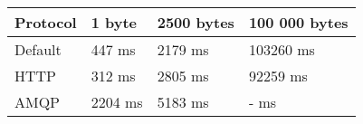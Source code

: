 \begin{tabularx}{\textwidth}{llll}
\hline
 Protocol   & 1 byte   & 2500 bytes   & 100 000 bytes   \\
\hline
 Default    & 447 ms   & 2179 ms      & 103260 ms       \\
 HTTP       & 312 ms   & 2805 ms      & 92259 ms        \\
 AMQP       & 2204 ms  & 5183 ms      & - ms            \\
\hline
\end{tabularx}